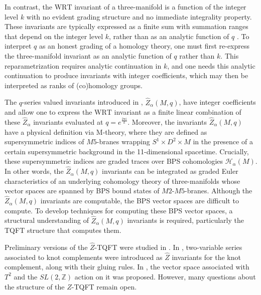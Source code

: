 \documentclass{article}
\newcommand{\Z}{{\mathbb Z}}
\numberwithin{corollary}{theorem}
\numberwithin{corollary}{proposition}
\begin{document}
In contrast, the $\mathrm{WRT}$ invariant of a three-manifold is a function of the integer level $k$ with no evident grading structure and no immediate integrality property. These invariants are typically expressed as a finite sum with summation ranges that depend on the integer level $k$, rather than as an analytic function of $q$ \cite{Jeffrey92, FreedGompf}. To interpret $q$ as an honest grading of a homology theory, one must first re-express the three-manifold invariant as an analytic function of $q$ rather than $k$. This reparametrization requires analytic continuation in $k$, and one needs this analytic continuation to produce invariants with integer coefficients, which may then be interpreted as ranks of (co)homology groups. 

The $q$-series valued invariants introduced in \cite{GPPV}, $\hat{Z}_{\alpha}(M,q)$, have integer coefficients and allow one to express the $\mathrm{WRT}$ invariant as a finite linear combination of these $\hat{Z}_{\alpha}$ invariants evaluated at $q= e^{\frac{2 \pi i}{k}}$. Moreover, the invariants $\hat{Z}_\alpha(M,q)$ have a physical definition via M-theory, where they are defined as supersymmetric indices of $M5$-branes wrapping $S^1\times D^2\times M$ in the presence of a certain supersymmetric background in the 11-dimensional spacetime. Crucially, these supersymmetric indices are graded traces over BPS cohomologies $\mathcal{H}_\alpha (M)$. In other words, the $\hat{Z}_\alpha(M,q)$ invariants can be integrated as graded Euler characteristics of an underlying cohomology theory of three-manifolds whose vector spaces are spanned by BPS bound states of $M2$-$M5$-branes. Although the $\hat{Z}_\alpha(M,q)$ invariants are computable, the BPS vector spaces are difficult to compute. To develop techniques for computing these BPS vector spaces, a structural understanding of $\hat{Z}_\alpha(M,q)$ invariants is required, particularly the TQFT structure that computes them.

Preliminary versions of the $\hat{Z}$-TQFT were studied in \cite{GM, MJ}. In \cite{GM}, two-variable series associated to knot complements were introduced as $\hat{Z}$ invariants for the knot complement, along with their gluing rules. In \cite{MJ},  the vector space associated with $T^{2}$ and the $SL(2,\Z)$ action on it was proposed. However, many questions about the structure of the $\hat{Z}$-TQFT remain open. 
\end{document}
